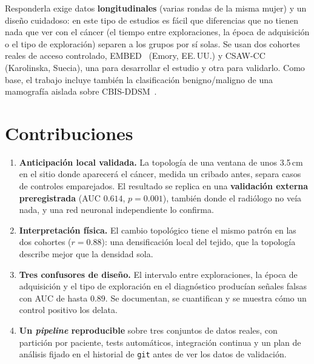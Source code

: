 Responderla exige datos \textbf{longitudinales} (varias rondas de la misma
mujer) y un diseño cuidadoso: en este tipo de estudios es fácil que
diferencias que no tienen nada que ver con el cáncer (el tiempo entre
exploraciones, la época de adquisición o el tipo de exploración) separen a
los grupos por sí solas. Se usan dos cohortes reales de acceso controlado,
EMBED~\cite{jeong2021embed} (Emory, EE.\,UU.) y CSAW-CC~\cite{dataset_csawcc}
(Karolinska, Suecia), una para desarrollar el estudio y otra para validarlo.
Como base, el trabajo incluye también la clasificación benigno/maligno de una
mamografía aislada sobre \mbox{CBIS-DDSM}~\cite{lee2017cbisddsm}.

\section{Contribuciones}
\begin{enumerate}
  \item \textbf{Anticipación local validada.} La topología de una ventana de
        unos 3.5\,cm en el sitio donde aparecerá el cáncer, medida un cribado
        antes, separa casos de controles emparejados. El resultado se
        replica en una \textbf{validación externa preregistrada} (AUC
        $0.614$, $p = 0.001$), también donde el radiólogo no veía nada, y una
        red neuronal independiente lo confirma.
  \item \textbf{Interpretación física.} El cambio topológico tiene el mismo
        patrón en las dos cohortes ($r = 0.88$): una densificación local del
        tejido, que la topología describe mejor que la densidad sola.
  \item \textbf{Tres confusores de diseño.} El intervalo entre
        exploraciones, la época de adquisición y el tipo de exploración en el
        diagnóstico producían señales falsas con AUC de hasta $0.89$. Se
        documentan, se cuantifican y se muestra cómo un control positivo los
        delata.
  \item \textbf{Un \textit{pipeline} reproducible} sobre tres conjuntos de
        datos reales, con partición por paciente, tests automáticos,
        integración continua y un plan de análisis fijado en el historial de
        \texttt{git} antes de ver los datos de validación.
\end{enumerate}

